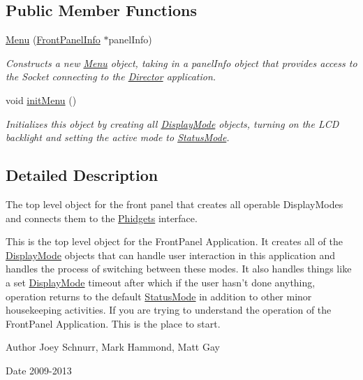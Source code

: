 \subsection*{Public Member Functions}
\begin{DoxyCompactItemize}
\item 
\hyperlink{class_menu_aa515edd7f33010c5f9c42a693c79dcc6}{Menu} (\hyperlink{class_front_panel_info}{Front\-Panel\-Info} $\ast$panel\-Info)
\begin{DoxyCompactList}\small\item\em Constructs a new \hyperlink{class_menu}{Menu} object, taking in a panel\-Info object that provides access to the Socket connecting to the \hyperlink{class_director}{Director} application. \end{DoxyCompactList}\item 
\hypertarget{class_menu_aebc90f39203524becf5ad750269d5d82}{void \hyperlink{class_menu_aebc90f39203524becf5ad750269d5d82}{init\-Menu} ()}\label{class_menu_aebc90f39203524becf5ad750269d5d82}

\begin{DoxyCompactList}\small\item\em Initializes this object by creating all \hyperlink{class_display_mode}{Display\-Mode} objects, turning on the L\-C\-D backlight and setting the active mode to \hyperlink{class_status_mode}{Status\-Mode}. \end{DoxyCompactList}\end{DoxyCompactItemize}


\subsection{Detailed Description}
The top level object for the front panel that creates all operable Display\-Modes and connects them to the \hyperlink{class_phidgets}{Phidgets} interface. 

This is the top level object for the Front\-Panel Application. It creates all of the \hyperlink{class_display_mode}{Display\-Mode} objects that can handle user interaction in this application and handles the process of switching between these modes. It also handles things like a set \hyperlink{class_display_mode}{Display\-Mode} timeout after which if the user hasn't done anything, operation returns to the default \hyperlink{class_status_mode}{Status\-Mode} in addition to other minor housekeeping activities. If you are trying to understand the operation of the Front\-Panel Application. This is the place to start. \begin{DoxyAuthor}{Author}
Joey Schnurr, Mark Hammond, Matt Gay 
\end{DoxyAuthor}
\begin{DoxyDate}{Date}
2009-\/2013 
\end{DoxyDate}


